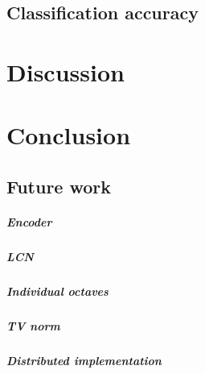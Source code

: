 \documentclass[a4paper,12pt,twoside]{report}
\begin{document}
\section{Classification accuracy}

\chapter{Discussion}
\label{discussion}

\chapter*{Conclusion}
\label{conclusion}

\section*{Future work}

\paragraph{Encoder}

\paragraph{LCN}

\paragraph{Individual octaves}

\paragraph{TV norm}

\paragraph{Distributed implementation}
\end{document}
